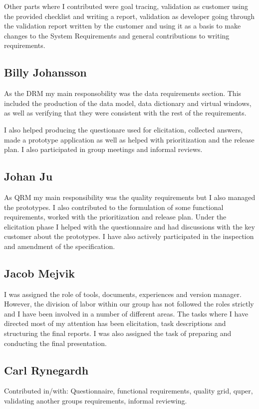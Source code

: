 \documentclass[10pt,a4paper]{article}
\begin{document}
Other parts where I contributed were goal tracing, validation as customer using the provided checklist and writing a report, validation as developer going through the validation report written by the customer and using it as a basis to make changes to the System Requirements and general contributions to writing requirements.

\subsection{Billy Johansson}
As the DRM my main responsobility was the data requirements section. This included the production of the data model, data dictionary and virtual windows, as well as verifying that they were consistent with the rest of the requirements.

I also helped producing the questionare used for elicitation, collected answers, made a prototype application as well as helped with prioritization and the release plan. I also participated in group meetings and informal reviews. 

\subsection{Johan Ju}
As QRM my main responsibility was the quality requirements but I also managed the prototypes. I also contributed to the formulation of some functional requirements, worked with the prioritization and release plan. Under the elicitation phase I helped with the questionnaire and had discussions with the key customer about the prototypes. I have also actively participated in the inspection and amendment of the specification.

\subsection{Jacob Mejvik}

I was assigned the role of tools, documents, experiences and version manager. However, the division of labor within our group has not followed the roles strictly and I have been involved in a number of different areas. The tasks where I have directed most of my attention has been elicitation, task descriptions and structuring the final reports. I was also assigned the task of preparing and conducting the final presentation. 


\subsection{Carl Rynegardh}
Contributed in/with: Questionnaire, functional requirements, quality grid, quper, validating another groups requirements, informal reviewing.
\end{document}
